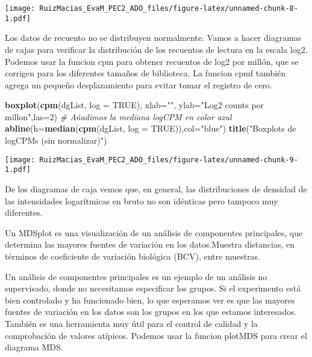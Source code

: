 \documentclass[
]{article}
\newenvironment{Shaded}{\begin{snugshade}}{\end{snugshade}}
\newcommand{\CommentTok}[1]{\textcolor[rgb]{0.56,0.35,0.01}{\textit{#1}}}
\newcommand{\DataTypeTok}[1]{\textcolor[rgb]{0.13,0.29,0.53}{#1}}
\newcommand{\DecValTok}[1]{\textcolor[rgb]{0.00,0.00,0.81}{#1}}
\newcommand{\KeywordTok}[1]{\textcolor[rgb]{0.13,0.29,0.53}{\textbf{#1}}}
\newcommand{\NormalTok}[1]{#1}
\newcommand{\OtherTok}[1]{\textcolor[rgb]{0.56,0.35,0.01}{#1}}
\newcommand{\StringTok}[1]{\textcolor[rgb]{0.31,0.60,0.02}{#1}}
\begin{document}
\texttt{[image: RuizMacias\_EvaM\_PEC2\_ADO\_files/figure-latex/unnamed-chunk-8-1.pdf]}

Los datos de recuento no se distribuyen normalmente. Vamos a hacer
diagramas de cajas para verificar la distribución de los recuentos de
lectura en la escala log2. Podemos usar la funcion cpm para obtener
recuentos de log2 por millón, que se corrigen para los diferentes
tamaños de biblioteca. La funcion cpmf también agrega un pequeño
desplazamiento para evitar tomar el registro de cero.

\begin{Shaded}
\begin{Highlighting}[]
\KeywordTok{boxplot}\NormalTok{(}\KeywordTok{cpm}\NormalTok{(dgList, }\DataTypeTok{log =} \OtherTok{TRUE}\NormalTok{), }\DataTypeTok{xlab=}\StringTok{""}\NormalTok{, }\DataTypeTok{ylab=}\StringTok{"Log2 counts por millon"}\NormalTok{,}\DataTypeTok{las=}\DecValTok{2}\NormalTok{)}
\CommentTok{# Añadimos la mediana logCPM en color azul}
\KeywordTok{abline}\NormalTok{(}\DataTypeTok{h=}\KeywordTok{median}\NormalTok{(}\KeywordTok{cpm}\NormalTok{(dgList, }\DataTypeTok{log =} \OtherTok{TRUE}\NormalTok{)),}\DataTypeTok{col=}\StringTok{"blue"}\NormalTok{)}
\KeywordTok{title}\NormalTok{(}\StringTok{"Boxplots de logCPMs (sin normalizar)"}\NormalTok{)}
\end{Highlighting}
\end{Shaded}

\texttt{[image: RuizMacias\_EvaM\_PEC2\_ADO\_files/figure-latex/unnamed-chunk-9-1.pdf]}

De los diagramas de caja vemos que, en general, las distribuciones de
densidad de las intensidades logarítmicas en bruto no son idénticas pero
tampoco muy diferentes.

Un MDSplot es una visualización de un análisis de componentes
principales, que determina las mayores fuentes de variación en los
datos.Muestra distancias, en términos de coeficiente de variación
biológica (BCV), entre muestras.

Un análisis de componentes principales es un ejemplo de un análisis no
supervisado, donde no necesitamos especificar los grupos. Si el
experimento está bien controlado y ha funcionado bien, lo que esperamos
ver es que las mayores fuentes de variación en los datos son los grupos
en los que estamos interesados. También es una herramienta muy útil para
el control de calidad y la comprobación de valores atípicos. Podemos
usar la funcion plotMDS para crear el diagrama MDS.
\end{document}
